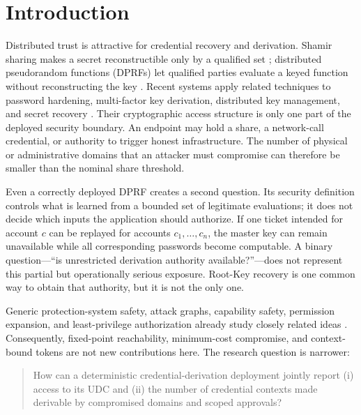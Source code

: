 \documentclass[preprint,12pt]{elsarticle}
\begin{document}
\section{Introduction}

Distributed trust is attractive for credential recovery and derivation.
Shamir sharing makes a secret reconstructible only by a qualified set
\cite{shamir1979}; distributed pseudorandom functions (DPRFs) let qualified
parties evaluate a keyed function without reconstructing the key
\cite{naor1999dprf}.  Recent systems apply related techniques to password
hardening, multi-factor key derivation, distributed key management, and secret
recovery \cite{everspaugh2015pythia,jarecki2017toppss,nair2023mfkdf,
geihs2024lakey,connell2024svr3}.  Their cryptographic access structure is only
one part of the deployed security boundary.  An endpoint may hold a share, a
network-call credential, or authority to trigger honest infrastructure.  The
number of physical or administrative domains that an attacker must compromise
can therefore be smaller than the nominal share threshold.

Even a correctly deployed DPRF creates a second question.  Its security
definition controls what is learned from a bounded set of legitimate
evaluations; it does not decide which inputs the application should authorize.
If one ticket intended for account $c$ can be replayed for accounts
$c_1,\ldots,c_n$, the master key can remain unavailable while all corresponding
passwords become computable.  A binary question---``is unrestricted
derivation authority available?''---does not represent this partial but
operationally serious exposure.  Root-Key recovery is one common way to obtain
that authority, but it is not the only one.

Generic protection-system safety, attack graphs, capability safety, permission
expansion, and least-privilege authorization already study closely related
ideas \cite{hru1976,ou2005mulval,wang2006hardening,
maffeis2010capabilities,lee2021polyscope,cao2024leastprivilege}.  Consequently,
fixed-point reachability, minimum-cost compromise, and context-bound tokens are
not new contributions here.  The research question is narrower:

\begin{quote}
How can a deterministic credential-derivation deployment jointly report (i)
access to its UDC and (ii) the number of credential contexts made
derivable by compromised domains and scoped approvals?
\end{quote}
\end{document}
